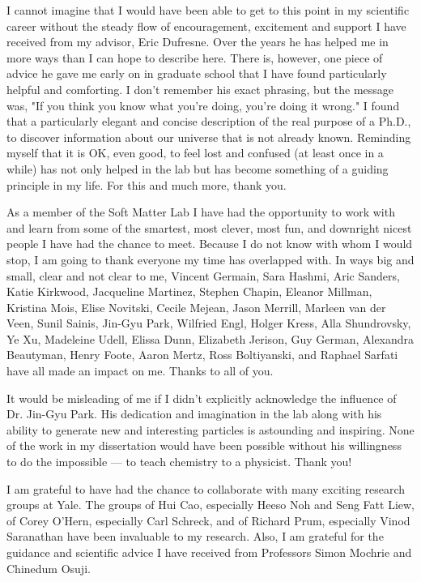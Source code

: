 I cannot imagine that I would have been able to get to this point in my scientific career without the steady flow of encouragement, excitement and support I have received from my advisor, Eric Dufresne.
Over the years he has helped me in more ways than I can hope to describe here.
There is, however, one piece of advice he gave me early on in graduate school that I have found particularly helpful and comforting.
I don't remember his exact phrasing, but the message was, "If you think you know what you're doing, you're doing it wrong."
I found that a particularly elegant and concise description of the real purpose of a Ph.D., to discover information about our universe that is not already known.
Reminding myself that it is OK, even good, to feel lost and confused (at least once in a while) has not only helped in the lab but has become something of a guiding principle in my life.
For this and much more, thank you.

As a member of the Soft Matter Lab I have had the opportunity to work with and learn from some of the smartest, most clever, most fun, and downright nicest people I have had the chance to meet.
Because I do not know with whom I would stop, I am going to thank everyone my time has overlapped with. 
In ways big and small, clear and not clear to me, Vincent Germain, Sara Hashmi, Aric Sanders, Katie Kirkwood, Jacqueline Martinez, Stephen Chapin, Eleanor Millman, Kristina Mois, Elise Novitski, Cecile Mejean, Jason Merrill, Marleen van der Veen, Sunil Sainis, Jin-Gyu Park, Wilfried Engl, Holger Kress, Alla Shundrovsky, Ye Xu, Madeleine Udell, Elissa Dunn, Elizabeth Jerison, Guy German, Alexandra Beautyman, Henry Foote, Aaron Mertz, Ross Boltiyanski, and Raphael Sarfati have all made an impact on me. 
Thanks to all of you.

It would be misleading of me if I didn't explicitly acknowledge the influence of Dr. Jin-Gyu Park.
His dedication and imagination in the lab along with his ability to generate new and interesting particles is astounding and inspiring.
None of the work in my dissertation would have been possible without his willingness to do the impossible --- to teach chemistry to a physicist.
Thank you!

I am grateful to have had the chance to collaborate with many exciting research groups at Yale. 
The groups of Hui Cao, especially Heeso Noh and Seng Fatt Liew, of Corey O'Hern, especially Carl Schreck, and of Richard Prum, especially Vinod Saranathan have been invaluable to my research.
Also, I am grateful for the guidance and scientific advice I have received from Professors Simon Mochrie and Chinedum Osuji.

